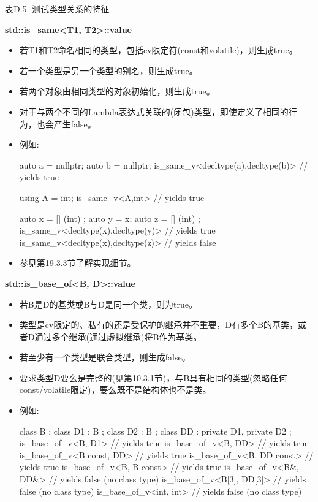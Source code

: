 \begin{center}
表D.5. 测试类型关系的特征
\end{center}

\textbf{std::is\_same<T1, T2>::value}

\begin{itemize}
\item
若T1和T2命名相同的类型，包括cv限定符(const和volatile)，则生成true。

\item
若一个类型是另一个类型的别名，则生成true。

\item
若两个对象由相同类型的对象初始化，则生成true。

\item
对于与两个不同的Lambda表达式关联的(闭包)类型，即使定义了相同的行为，也会产生false。

\item
例如:
\begin{cpp}
auto a = nullptr;
auto b = nullptr;
is_same_v<decltype(a),decltype(b)> // yields true

using A = int;
is_same_v<A,int> // yields true

auto x = [] (int) {};
auto y = x;
auto z = [] (int) {};
is_same_v<decltype(x),decltype(y)> // yields true
is_same_v<decltype(x),decltype(z)> // yields false
\end{cpp}

\item
参见第19.3.3节了解实现细节。
\end{itemize}

\textbf{std::is\_base\_of<B, D>::value}

\begin{itemize}
\item
若B是D的基类或B与D是同一个类，则为true。

\item
类型是cv限定的、私有的还是受保护的继承并不重要，D有多个B的基类，或者D通过多个继承(通过虚拟继承)将B作为基类。

\item
若至少有一个类型是联合类型，则生成false。

\item
要求类型D要么是完整的(见第10.3.1节)，与B具有相同的类型(忽略任何const/volatile限定)，要么既不是结构体也不是类。

\item
例如:
\begin{cpp}
class B {
};
class D1 : B {
};
class D2 : B {
};
class DD : private D1, private D2 {
};
is_base_of_v<B, D1> // yields true
is_base_of_v<B, DD> // yields true
is_base_of_v<B const, DD> // yields true
is_base_of_v<B, DD const> // yields true
is_base_of_v<B, B const> // yields true
is_base_of_v<B&, DD&> // yields false (no class type)
is_base_of_v<B[3], DD[3]> // yields false (no class type)
is_base_of_v<int, int> // yields false (no class type)
\end{cpp}
\end{itemize}

